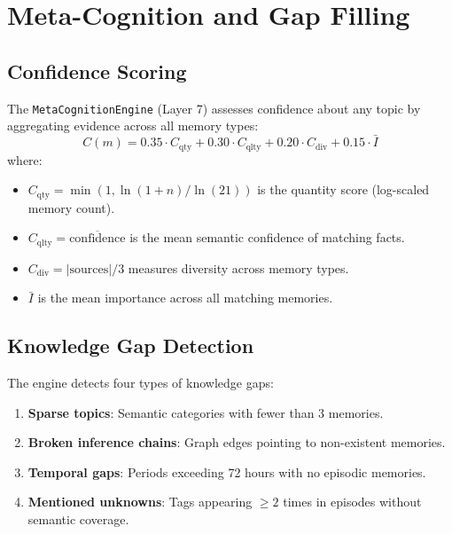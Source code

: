 \documentclass[runningheads]{llncs}
\begin{document}
\section{Meta-Cognition and Gap Filling}\label{sec:metacog}

\subsection{Confidence Scoring}\label{sec:confidence}

The \texttt{MetaCognitionEngine} (Layer 7) assesses confidence about any topic by aggregating evidence across all memory types:
\begin{equation}\label{eq:confidence}
    C(m) = 0.35 \cdot C_{\text{qty}} + 0.30 \cdot C_{\text{qlty}} + 0.20 \cdot C_{\text{div}} + 0.15 \cdot \bar{I}
\end{equation}
where:
\begin{itemize}[leftmargin=*]
    \item $C_{\text{qty}} = \min(1, \ln(1+n) / \ln(21))$ is the quantity score (log-scaled memory count).
    \item $C_{\text{qlty}} = \overline{\text{confidence}}$ is the mean semantic confidence of matching facts.
    \item $C_{\text{div}} = |\text{sources}| / 3$ measures diversity across memory types.
    \item $\bar{I}$ is the mean importance across all matching memories.
\end{itemize}

\subsection{Knowledge Gap Detection}

The engine detects four types of knowledge gaps:
\begin{enumerate}[leftmargin=*]
    \item \textbf{Sparse topics}: Semantic categories with fewer than 3 memories.
    \item \textbf{Broken inference chains}: Graph edges pointing to non-existent memories.
    \item \textbf{Temporal gaps}: Periods exceeding 72 hours with no episodic memories.
    \item \textbf{Mentioned unknowns}: Tags appearing $\geq 2$ times in episodes without semantic coverage.
\end{enumerate}
\end{document}
